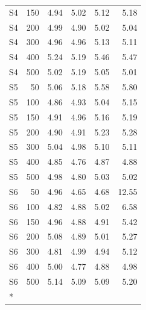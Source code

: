 \begin{longtable}[t]{lrrrrr}
S4 & 150 & 4.94 & 5.02 & 5.12 & 5.18\\
S4 & 200 & 4.99 & 4.90 & 5.02 & 5.04\\
S4 & 300 & 4.96 & 4.96 & 5.13 & 5.11\\
S4 & 400 & 5.24 & 5.19 & 5.46 & 5.47\\
S4 & 500 & 5.02 & 5.19 & 5.05 & 5.01\\
S5 & 50 & 5.06 & 5.18 & 5.58 & 5.80\\
S5 & 100 & 4.86 & 4.93 & 5.04 & 5.15\\
S5 & 150 & 4.91 & 4.96 & 5.16 & 5.19\\
S5 & 200 & 4.90 & 4.91 & 5.23 & 5.28\\
S5 & 300 & 5.04 & 4.98 & 5.10 & 5.11\\
S5 & 400 & 4.85 & 4.76 & 4.87 & 4.88\\
S5 & 500 & 4.98 & 4.80 & 5.03 & 5.02\\
S6 & 50 & 4.96 & 4.65 & 4.68 & 12.55\\
S6 & 100 & 4.82 & 4.88 & 5.02 & 6.58\\
S6 & 150 & 4.96 & 4.88 & 4.91 & 5.42\\
S6 & 200 & 5.08 & 4.89 & 5.01 & 5.27\\
S6 & 300 & 4.81 & 4.99 & 4.94 & 5.12\\
S6 & 400 & 5.00 & 4.77 & 4.88 & 4.98\\
S6 & 500 & 5.14 & 5.09 & 5.09 & 5.20\\*
\end{longtable}
\endgroup{}
